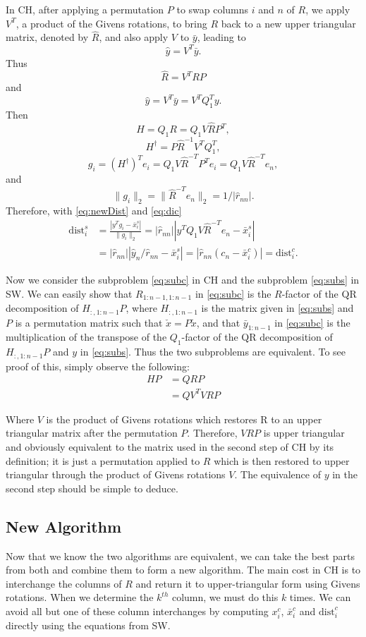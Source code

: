 \documentclass[12pt,Bold,letterpaper]{mcgilletdclass}
\newcommand{\dist}{\mathrm{dist}}
\newcommand{\vsp}{\vspace{\baselineskip}}
\begin{document}
In CH, after applying a permutation $P$ to swap columns $i$ and $n$ of $R$,  
we apply $V^T$, a product of the Givens rotations, to bring $R$ back to a new upper triangular
matrix, denoted by $\hat{R}$, and also apply $V$ to $\bar{y}$, 
leading to  $$\hat{y} = V^T\bar{y}.$$
Thus  $$\hat{R}=V^T RP$$ and $$\hat{y} = V^T\bar{y}=V^TQ_1^Ty.$$
Then $$H=Q_1R= Q_1V\hat{R}P^T,$$ $$H^\dag= P\hat{R}^{-1}V^TQ_1^T,$$ 
$$g_i=(H^\dag)^Te_i=Q_1V\hat{R}^{-T}P^Te_i=Q_1V\hat{R}^{-T}e_n,$$
and $$\|g_i\|_2=\|\hat{R}^{-T}e_n\|_2=1/|\hat{r}_{nn}|.$$
Therefore, with \eqref{eq:newDist} and \eqref{eq:dic}
\begin{align}
\dist_i^s
&=\frac{ | y^Tg_i - \bar{x}_i^s   |}{  \| g_i   \|_2} 
=|\hat{r}_{nn}||y^TQ_1V\hat{R}^{-T}e_n- \bar{x}_i^s  |  \label{eq:disc} \\
& = |\hat{r}_{nn}|| \hat{y}_n/\hat{r}_{nn} - \bar{x}_i^s | 
 = |\hat{r}_{nn}(c_n-\bar{x}_i^c)| =\dist_i^c.  \nonumber
\end{align}

Now we consider  the subproblem \eqref{eq:subc} in CH and the subproblem \eqref{eq:subs} in SW.
We can easily show that $R_{1:n-1,1:n-1}$ in  \eqref{eq:subc} is the $R$-factor of the QR decomposition
of $H_{:,1:n-1}P$, where $H_{:,1:n-1}$ is the matrix given in \eqref{eq:subs}
and $P$ is a permutation matrix such that $\check{x}=P\tilde{x}$,
and that $\bar{y}_{1:n-1}$ in  \eqref{eq:subc} is the multiplication of the transpose of 
the $Q_1$-factor of the QR decomposition of $H_{:,1:n-1}P$ and $y$ in \eqref{eq:subs}.
Thus the two subproblems are equivalent. To see proof of this, simply observe the following:
\begin{align}
HP &= QRP \\
&=QV^TVRP
\end{align}

Where $V$ is the product of Givens rotations which restores R to an upper triangular matrix after the permutation $P$. Therefore, $VRP$ is upper triangular and obviously equivalent to the matrix used in the second step of CH by its definition; it is just a permutation applied to $R$ which is then restored to upper triangular through the product of Givens rotations $V$. The equivalence of $y$ in the second step should be simple to deduce.

\vsp \subsection{New Algorithm} \label{subsec:newReduction}
Now that we know the two algorithms are equivalent, we can take the best
parts from both and combine them to form a new algorithm. 
The main cost in CH is to interchange the columns of $R$ and return it to
upper-triangular form using Givens rotations. 
When we determine the $k^{th}$ column,  we must do this $k$ times. 
We can avoid all but one of these column interchanges by computing $x_i^c$, 
$\bar{x}_i^c$ and $\dist_i^c$ directly using the equations from SW. 
\end{document}

